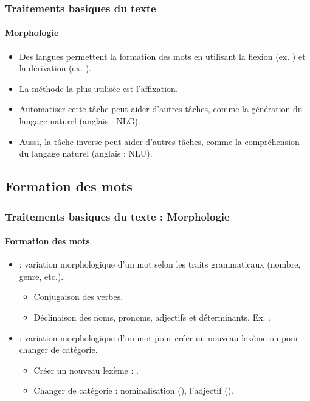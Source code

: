 \documentclass[xcolor=table]{beamer}
\begin{document}
\begin{frame}
\frametitle{Traitements basiques du texte}
\framesubtitle{Morphologie}

\begin{itemize}
	\item Des langues permettent la formation des mots en utilisant la flexion (ex. ) et la dérivation (ex. ).
	\item La  méthode la plus utilisée est l'affixation.
	\item Automatiser cette tâche peut aider d'autres tâches, comme la génération du langage naturel (anglais : NLG).
	\item Aussi, la tâche inverse peut aider d'autres tâches, comme la compréhension du langage naturel (anglais : NLU).
\end{itemize}

\end{frame}

\subsection{Formation des mots}

\begin{frame}
\frametitle{Traitements basiques du texte : Morphologie}
\framesubtitle{Formation des mots}
\begin{itemize}
	\item {} : variation morphologique d'un mot selon les traits grammaticaux (nombre, genre, etc.).
	\begin{itemize}
		\item Conjugaison des verbes.
		\item Déclinaison des noms, pronoms, adjectifs et déterminants. 
		Ex. .
	\end{itemize}
	\item {} : variation morphologique d'un mot pour créer un nouveau lexème ou pour changer de catégorie.
	\begin{itemize}
		\item Créer un nouveau lexème : .
		\item Changer de catégorie : nominalisation (), l'adjectif ().
	\end{itemize}
\end{itemize}

\end{frame}
\end{document}

